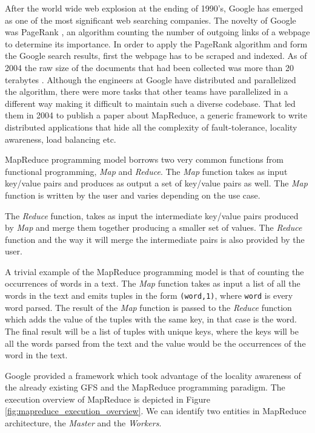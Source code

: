 After the world wide web explosion at the ending of 1990's, Google has
emerged as one of the most significant web searching companies.
The novelty of Google was PageRank \cite{ilprints361}, an
algorithm counting the number of outgoing links of a webpage to determine its
importance. In order to apply the PageRank algorithm and form the
Google search results, first the webpage has to be scraped and
indexed. As of 2004 the raw size of the documents that had been
collected was more than 20 terabytes
\cite{Dean:2004:MSD:1251254.1251264}. Although the engineers at Google
have distributed and parallelized the algorithm, there were more tasks
that other teams have parallelized in a different way making it
difficult to maintain such a diverse codebase. That led them in 2004
to publish a paper about MapReduce, a generic framework to write distributed
applications that hide all the complexity of fault-tolerance, locality
awareness, load balancing etc.

MapReduce programming model borrows two very common functions from
functional programming, \emph{Map} and \emph{Reduce}. The \emph{Map}
function takes as input key/value pairs and produces as output a set
of key/value pairs as well. The \emph{Map} function is written by the
user and varies depending on the use case.

The \emph{Reduce} function, takes as input the
intermediate key/value pairs produced by \emph{Map} and merge them
together producing a smaller set of values. The \emph{Reduce} function
and the way it will merge the intermediate pairs is also provided by
the user.

A trivial example of the MapReduce programming model is that of
counting the occurrences of words in a text. The \emph{Map} function
takes as input a list of all the words in the text and emits tuples
in the form \texttt{(word,1)}, where \texttt{word} is every word
parsed. The result of the \emph{Map} function is passed to the
\emph{Reduce} function which adds the value of the tuples with the
same key, in that case is the word. The final result will be a list of
tuples with unique keys, where the keys will be all the words parsed from the text and the
value would be the occurrences of the word in the text.

Google provided a framework which took advantage of the locality
awareness of the already existing GFS and the MapReduce programming
paradigm. The execution overview of MapReduce is depicted in Figure
\ref{fig:mapreduce_execution_overview}. We can identify two entities
in MapReduce architecture, the \emph{Master} and the \emph{Workers}.


